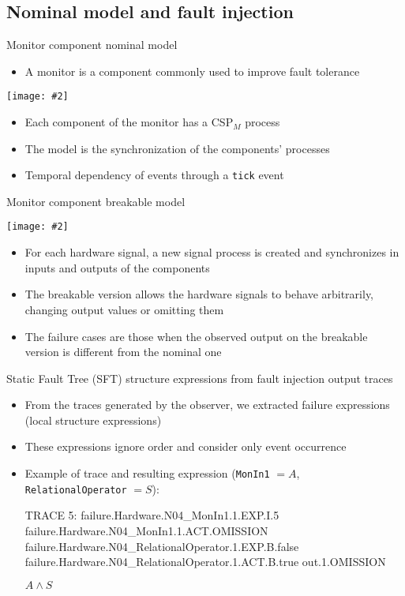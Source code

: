 \documentclass{beamer}
\def\SFT{%
	Static Fault Tree (SFT)%
	\gdef\SFT{SFT\xspace}%
	\gdef\SFTs{SFTs\xspace}%
	\xspace%
}
\def\SFTs{%
	Static Fault Trees (SFTs)%
	\gdef\SFT{SFT\xspace}%
	\gdef\SFTs{SFTs\xspace}%
	\xspace%
}
\newcommand{\includegraphicsaspectratio}[2][1]{%
  \texttt{[image: \#2]}%
}
\def\CSPm{CSP$_M$\xspace}
\newenvironment{snippetcspm}[1][2]
{
\ifthenelse{\equal{#1}{0}}
    {\tiny}
    {
    \ifthenelse{\equal{#1}{1}}
        {\scriptsize}
        {
        \ifthenelse{\equal{#1}{2}}
            {\footnotesize}
            {\small}
        }
    }
\verbatim
}
{
\endverbatim
}
\begin{document}
\subsection{Nominal model and fault injection}

\begin{frame}[fragile]{Monitor component nominal model}
	\begin{itemize}
		\item A monitor is a component commonly used to improve fault tolerance
	\end{itemize}
	\begin{center}
		\includegraphicsaspectratio[0.60]{blockDiagramMonitorInternals}
	\end{center}
	\begin{itemize}
		\item Each component of the monitor has a \CSPm process
		\item The model is the synchronization of the components' processes
		\item Temporal dependency of events through a \verb$tick$ event
	\end{itemize}
\end{frame}

\begin{frame}[fragile]{Monitor component breakable model}
	\footnotesize
	\begin{center}
		\includegraphicsaspectratio[0.60]{monitor-breakable}
	\end{center}
	\begin{itemize}
		\item For each hardware signal, a new signal process is created and synchronizes in inputs and outputs of the components
		\item The breakable version allows the hardware signals to behave arbitrarily, changing output values or omitting them
		\item The failure cases are those when the observed output on the breakable version is different from the nominal one
	\end{itemize}
\end{frame}

\begin{frame}[fragile]{\SFT structure expressions from fault injection output traces}
	\begin{itemize}
		\item From the traces generated by the observer, we extracted failure expressions (local structure expressions)
		\item These expressions ignore order and consider only event occurrence
		\item Example of trace and resulting expression (\verb$MonIn1$ $=A$, \verb$RelationalOperator$ $=S$):
		\begin{snippetcspm}[1]
			TRACE 5:
			failure.Hardware.N04_MonIn1.1.EXP.I.5
			failure.Hardware.N04_MonIn1.1.ACT.OMISSION
			failure.Hardware.N04_RelationalOperator.1.EXP.B.false
			failure.Hardware.N04_RelationalOperator.1.ACT.B.true
			out.1.OMISSION
		\end{snippetcspm}
		$A \land S$
	\end{itemize}
\end{frame}
\end{document}
